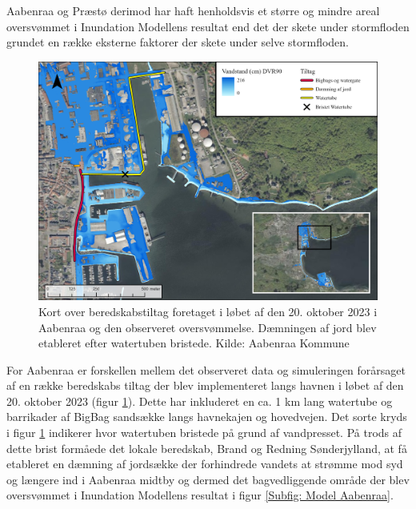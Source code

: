 Aabenraa og Præstø derimod har haft henholdsvis et større og mindre areal oversvømmet i Inundation Modellens resultat end det der skete under stormfloden grundet en række eksterne faktorer der skete under selve stormfloden.
\begin{figure}[H]
    \centering
    \includegraphics[width=0.8\linewidth]{images/diskussion/beredskabstiltag.jpg}
    \caption{Kort over beredskabstiltag foretaget i løbet af den 20. oktober 2023 i Aabenraa og den observeret oversvømmelse. Dæmningen af jord blev etableret efter watertuben bristede. Kilde: Aabenraa Kommune}
    \label{Figur: Beredskabstiltag}
\end{figure}
For Aabenraa er forskellen mellem det observeret data og simuleringen forårsaget af en række beredskabs tiltag der blev implementeret langs havnen i løbet af den 20. oktober 2023 (figur \ref{Figur: Beredskabstiltag}). Dette har inkluderet en ca. 1 km lang watertube og barrikader af BigBag sandsække langs havnekajen og hovedvejen. Det sorte kryds i figur \ref{Figur: Beredskabstiltag} indikerer hvor watertuben bristede på grund af vandpresset. På trods af dette brist formåede det lokale beredskab, Brand og Redning Sønderjylland, at få etableret en dæmning af jordsække der forhindrede vandets at strømme mod syd og længere ind i Aabenraa midtby og dermed det bagvedliggende område der blev oversvømmet i Inundation Modellens resultat i figur \ref{Subfig: Model Aabenraa}.\\


